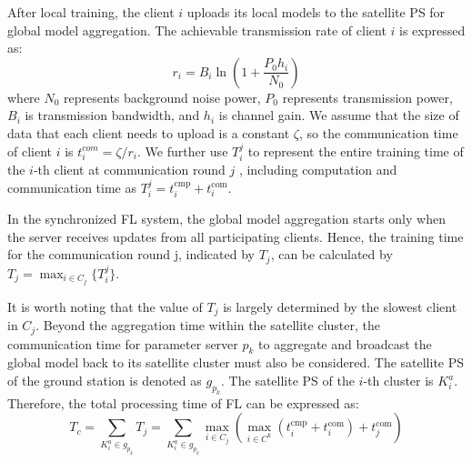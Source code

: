 After local training, the client $i$ uploads its local models to the satellite PS for global model aggregation. The achievable transmission rate of client $i$ is expressed as:
\begin{equation}
r_i = B_i \ln \left(1 + \frac{P_0 h_i}{N_0}\right)
\end{equation}
where $N_0$ represents background noise power, $P_0$ represents transmission power, $B_i$ is transmission bandwidth, and $h_i$ is channel gain. We assume that the size of data that each client needs to upload is a constant  $\zeta$, so the communication time of client $i$ is $t_{i}^{com} = {\zeta}/{r_i}$. We further use $T^j_i$ to represent the entire training time of the $i$-th client at communication round $j$ , including computation and communication time as $T_{i}^{j} =  t_{i}^{\text{cmp}} + t_{i}^{\text{com}} $.
\begin{comment}
\begin{equation}
T_{i}^{j} = \tau_{i}^{j} ( t_{i}^{\text{cmp}} + t_{i}^{\text{com}} )
        = \tau_{i}^{j}( \frac{D_i Q_i}{f_i} + \frac{\zeta}{B_i \ln(1 + \frac{\rho_i h_i}{N_0})} )
\end{equation}
\end{comment}

In the synchronized FL system, the global model aggregation starts only when the server receives updates from all participating clients. Hence, the training time for the communication round j, indicated by $T_j$, can be calculated by $T_j = \max_{i \in C_j} \{ T_{i}^{j} \}$.
\begin{comment}
\begin{align}
T_j &= \max_{i \in C_j} \{ T_{i}^{j} \}
\end{align}
\end{comment}
It is worth noting that the value of $T_j$ is largely determined by the slowest client in $C_j$.
Beyond the aggregation time within the satellite cluster, the communication time for parameter server $p_k$ to aggregate and broadcast the global model back to its satellite cluster must also be considered. The satellite PS of the ground station is denoted as $g_{p_k}$. The satellite PS of the $i$-th cluster is $K_i^a$. Therefore, the total processing time of FL can be expressed as:
\begin{equation}
T_c = \sum_{K_i^a \in {g_{p_k}} } T_j = \sum_{K_i^a\in {g_{p_k}}} \max_{i \in C_j} \left( \max_{i \in C^k}  \left(t_{i}^{\text{cmp}} + t_{i}^{\text{com}}\right) + t^{\text{com}}_j \right)
\label{eq:time}
\end{equation}


